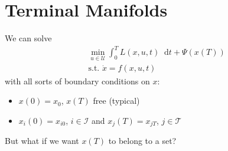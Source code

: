 \documentclass[letterpaper,12pt,titlepage]{report}
\newcommand*\dif{\mathop{}\!\mathrm{d}}
\theoremstyle{plain}
\theoremstyle{definition}
\begin{document}

\section{Terminal Manifolds}

We can solve
\begin{align}
  & \min_{u\in\mathcal U} \int_0^T L(x,u,t)\dif t + \Psi(x(T)) \\
  & \text{s.t. } \dot x = f(x,u,t)
\end{align}
with all sorts of boundary conditions on $x$:
\begin{itemize}
\item $x(0)=x_0$, $x(T)$ free (typical)
\item $x_i(0)=x_{i0}$, $i\in\mathcal I$ and $x_j(T)=x_{jT}$, $j\in\mathcal T$
\end{itemize}
But what if we want $x(T)$ to belong to a set?

\begin{center}
\end{center}
\end{document}
